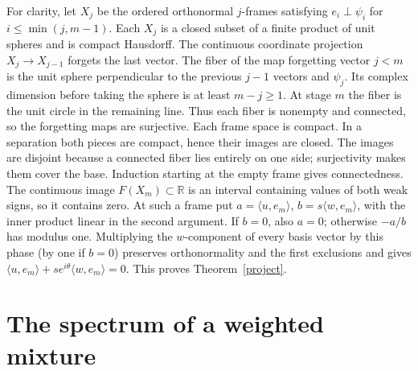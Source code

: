 \documentclass[11pt,a4paper]{article}
\theoremstyle{remark}
\begin{document}
For clarity, let \(X_j\) be the ordered orthonormal \(j\)-frames satisfying \(e_i\perp\psi_i\) for \(i\le\min(j,m-1)\). Each \(X_j\) is a closed subset of a finite product of unit spheres and is compact Hausdorff. The continuous coordinate projection \(X_j\to X_{j-1}\) forgets the last vector. The fiber of the map forgetting vector \(j<m\) is the unit sphere perpendicular to the previous \(j-1\) vectors and \(\psi_j\). Its complex dimension before taking the sphere is at least \(m-j\ge1\). At stage \(m\) the fiber is the unit circle in the remaining line. Thus each fiber is nonempty and connected, so the forgetting maps are surjective. Each frame space is compact. In a separation both pieces are compact, hence their images are closed. The images are disjoint because a connected fiber lies entirely on one side; surjectivity makes them cover the base. Induction starting at the empty frame gives connectedness. The continuous image \(F(X_m)\subset\mathbb R\) is an interval containing values of both weak signs, so it contains zero. At such a frame put \(a=\langle u,e_m\rangle\), \(b=s\langle w,e_m\rangle\), with the inner product linear in the second argument. If \(b=0\), also \(a=0\); otherwise \(-a/b\) has modulus one. Multiplying the \(w\)-component of every basis vector by this phase (by one if \(b=0\)) preserves orthonormality and the first exclusions and gives \(\langle u,e_m\rangle+s e^{i\theta}\langle w,e_m\rangle=0\). This proves Theorem~\ref{project}.

\section{The spectrum of a weighted mixture}
\end{document}
